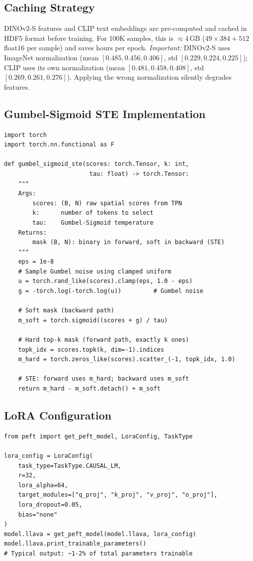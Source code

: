 \documentclass[11pt,a4paper]{article}
\begin{document}
\subsection{Caching Strategy}

DINOv2-S features and CLIP text embeddings are pre-computed and cached in HDF5
format before training. For 100K samples, this is ${\approx}4$\,GB
($49{\times}384{+}512$ float16 per sample) and saves hours per epoch.
\emph{Important:} DINOv2-S uses ImageNet normalization (mean
$[0.485,0.456,0.406]$, std $[0.229,0.224,0.225]$); CLIP uses its own
normalization (mean $[0.481,0.458,0.408]$, std $[0.269,0.261,0.276]$). Applying
the wrong normalization silently degrades features.

\subsection{Gumbel-Sigmoid STE Implementation}

\begin{lstlisting}[caption={Gumbel-Sigmoid straight-through estimator for
top-$k$ selection (PyTorch).}]
import torch
import torch.nn.functional as F

def gumbel_sigmoid_ste(scores: torch.Tensor, k: int,
                        tau: float) -> torch.Tensor:
    """
    Args:
        scores: (B, N) raw spatial scores from TPN
        k:      number of tokens to select
        tau:    Gumbel-Sigmoid temperature
    Returns:
        mask (B, N): binary in forward, soft in backward (STE)
    """
    eps = 1e-8
    # Sample Gumbel noise using clamped uniform
    u = torch.rand_like(scores).clamp(eps, 1.0 - eps)
    g = -torch.log(-torch.log(u))         # Gumbel noise

    # Soft mask (backward path)
    m_soft = torch.sigmoid((scores + g) / tau)

    # Hard top-k mask (forward path, exactly k ones)
    topk_idx = scores.topk(k, dim=-1).indices
    m_hard = torch.zeros_like(scores).scatter_(-1, topk_idx, 1.0)

    # STE: forward uses m_hard; backward uses m_soft
    return m_hard - m_soft.detach() + m_soft
\end{lstlisting}

\subsection{LoRA Configuration}

\begin{lstlisting}[caption={LoRA setup via PEFT library.}]
from peft import get_peft_model, LoraConfig, TaskType

lora_config = LoraConfig(
    task_type=TaskType.CAUSAL_LM,
    r=32,
    lora_alpha=64,
    target_modules=["q_proj", "k_proj", "v_proj", "o_proj"],
    lora_dropout=0.05,
    bias="none"
)
model.llava = get_peft_model(model.llava, lora_config)
model.llava.print_trainable_parameters()
# Typical output: ~1-2% of total parameters trainable
\end{lstlisting}
\end{document}
